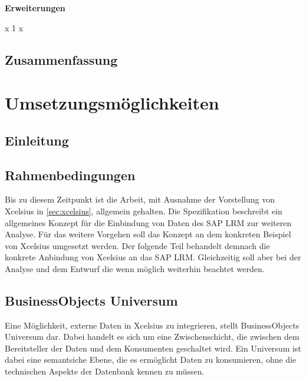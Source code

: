\begin{onehalfspacing}
{\textbf{Erweiterungen}
\begin{seToplist}{ x 1 x }
\vspace*{-4mm}
\end{seToplist}

}

\section{Zusammenfassung}

\chapter{Umsetzungsmöglichkeiten}
\section{Einleitung}
\section{Rahmenbedingungen}
Bis zu diesem Zeitpunkt ist die Arbeit, mit Ausnahme der Vorstellung von Xcelsius in \vref{sec:xcelsius}, allgemein gehalten. Die Spezifikation beschreibt ein allgemeines Konzept für die Einbindung von Daten des SAP LRM zur weiteren Analyse. Für das weitere Vorgehen soll das Konzept an dem konkreten Beispiel von Xcelsius umgesetzt werden. Der folgende Teil behandelt demnach die konkrete Anbindung von Xcelsius an das SAP LRM. Gleichzeitig soll aber bei der Analyse und dem Entwurf die  wenn möglich weiterhin beachtet werden.

\section{BusinessObjects Universum}
Eine Möglichkeit, externe Daten in Xcelsius zu integrieren, stellt BusinessObjects Universum dar. Dabei handelt es sich um eine Zwischenschicht, die zwischen dem Bereitsteller der Daten und dem Konsumenten geschaltet wird. Ein Universum ist dabei eine semantsiche Ebene, die es ermöglicht Daten zu konsumieren, ohne die technischen Aspekte der Datenbank kennen zu müssen.



\end{onehalfspacing}

